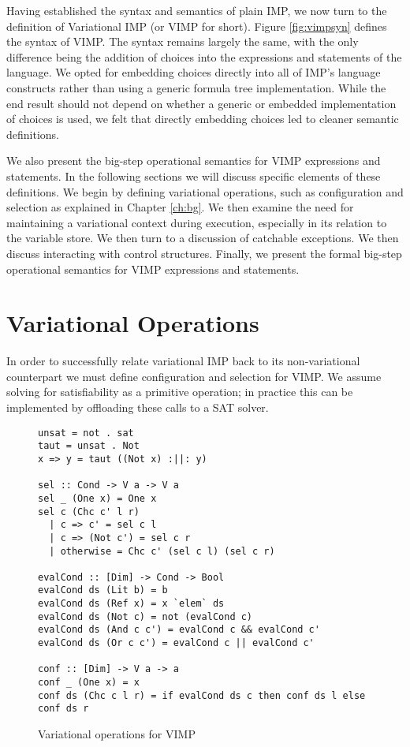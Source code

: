 \documentclass[12pt,oneside]{book}
\begin{document}
Having established the syntax and semantics of plain IMP, we now turn to the definition of Variational IMP (or VIMP for short).
Figure \ref{fig:vimpsyn} defines the syntax of VIMP. The syntax remains largely the same, with the only difference being the
addition of choices into the expressions and statements of the language. We opted for embedding choices directly into all of IMP's language constructs rather than using
a generic formula tree implementation. While the end result should not depend on whether a generic or embedded implementation of choices is
used, we felt that directly embedding choices led to cleaner semantic definitions.

We also present the big-step operational semantics for VIMP expressions and statements. In the following sections we will discuss specific elements of these definitions.
We begin by defining variational operations, such as configuration and selection as explained in Chapter \ref{ch:bg}. We then examine the need for maintaining a variational context during execution, especially in its relation to the variable store. We then turn to a discussion of
catchable exceptions. We then discuss interacting with control structures. Finally, we present the formal big-step operational semantics for VIMP expressions and statements.




\section{Variational Operations}

In order to successfully relate variational IMP back to its non-variational counterpart
we must define configuration and selection for VIMP. We assume solving for satisfiability
as a primitive operation; in practice this can be implemented by offloading these calls to
a SAT solver.

\begin{figure}
\begin{lstlisting}
unsat = not . sat
taut = unsat . Not
x => y = taut ((Not x) :||: y)

sel :: Cond -> V a -> V a
sel _ (One x) = One x
sel c (Chc c' l r)
  | c => c' = sel c l
  | c => (Not c') = sel c r
  | otherwise = Chc c' (sel c l) (sel c r)
  
evalCond :: [Dim] -> Cond -> Bool
evalCond ds (Lit b) = b
evalCond ds (Ref x) = x `elem` ds
evalCond ds (Not c) = not (evalCond c)
evalCond ds (And c c') = evalCond c && evalCond c'
evalCond ds (Or c c') = evalCond c || evalCond c'

conf :: [Dim] -> V a -> a
conf _ (One x) = x
conf ds (Chc c l r) = if evalCond ds c then conf ds l else conf ds r
\end{lstlisting}
\caption{Variational operations for VIMP}
\label{fig:varops}
\end{figure}
\end{document}
